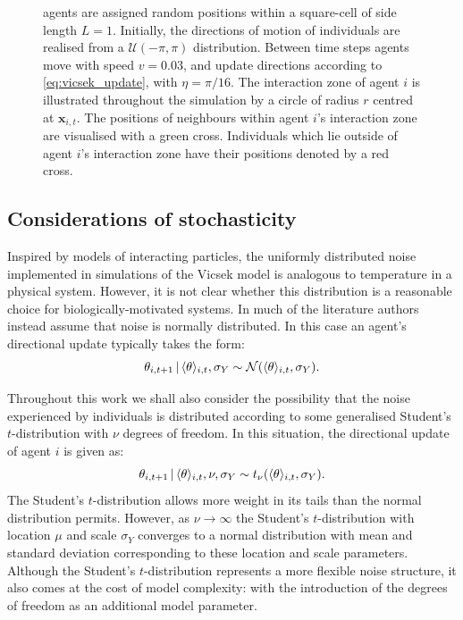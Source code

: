 \begin{figure}[tb]
{        agents are assigned random positions within a square-cell of side length $L=1$.
        Initially, the directions of motion of individuals are realised from a
        $\mathcal{U}(-\pi, \pi)$ distribution. Between time steps agents move with speed
        $v=0.03$, and update directions according to \cref{eq:vicsek_update}, with
        $\eta=\pi/16$. The interaction zone of agent $i$ is illustrated throughout the
        simulation by a circle of radius $r$ centred at $\bm{x}_{i,t}$. The positions of
        neighbours within agent $i$'s interaction zone are visualised with a green cross.
        Individuals which lie outside of agent $i$'s interaction zone have their positions
        denoted by a red cross.}
        \label{fig:vicsek_sim}
\end{figure}

\subsection{Considerations of stochasticity}

Inspired by models of interacting particles, the uniformly distributed noise implemented in
simulations of the Vicsek model is analogous to temperature in a physical system. However,
it is not clear whether this distribution is a reasonable choice for biologically-motivated
systems. In much of the literature authors instead assume that noise is normally
distributed. In this case an agent's directional update typically takes the form:
\begin{equation*}
    \theta_{i,t+1} \,|\, \langle\theta\rangle_{i,t}, \sigma_Y \sim
        \mathcal{N}(\langle\theta\rangle_{i,t}, \sigma_Y).
\end{equation*}

Throughout this work we shall also consider the possibility that the noise experienced by
individuals is distributed according to some generalised Student's $t$-distribution with
$\nu$ degrees of freedom. In this situation, the directional update of agent $i$ is given
as:
\begin{equation*}
    \theta_{i,t+1} \,|\, \langle\theta\rangle_{i,t}, \nu, \sigma_Y \sim
    t_{\nu}(\langle\theta\rangle_{i,t}, \sigma_Y).
\end{equation*}
The Student's $t$-distribution allows more weight in its tails than the normal
distribution permits. However, as $\nu\rightarrow\infty$ the Student's $t$-distribution
with location $\mu$ and scale $\sigma_Y$ converges to a normal distribution with mean and
standard deviation corresponding to these location and scale parameters.  Although the
Student's $t$-distribution represents a more flexible noise structure, it also comes at
the cost of model complexity: with the introduction of the degrees of freedom as an
additional model parameter.

